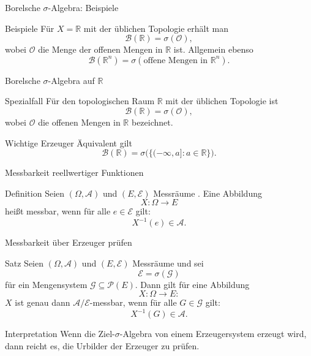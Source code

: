 \documentclass{beamer}
\begin{document}
\begin{frame}{Borelsche \(\sigma\)-Algebra: Beispiele}
\begin{block}{Beispiele}
Für \(X=\mathbb R\) mit der üblichen Topologie erhält man
\[
\mathcal B(\mathbb R)=\sigma(\mathcal O),
\]
wobei \(\mathcal O\) die Menge der offenen Mengen in \(\mathbb R\) ist.
Allgemein ebenso
\[
\mathcal B(\mathbb R^n)=\sigma(\text{offene Mengen in }\mathbb R^n).
\]
\end{block}
\end{frame}

\begin{frame}{Borelsche \(\sigma\)-Algebra auf \(\mathbb R\)}
\begin{block}{Spezialfall}
Für den topologischen Raum \(\mathbb R\) mit der üblichen Topologie ist
\[
\mathcal B(\mathbb R)=\sigma(\mathcal O),
\]
wobei \(\mathcal O\) die offenen Mengen in \(\mathbb R\) bezeichnet.
\end{block}

\begin{block}{Wichtige Erzeuger}
Äquivalent gilt
\[
\mathcal B(\mathbb R)=\sigma\bigl(\{(-\infty,a] : a\in\mathbb R\}\bigr).
\]
\end{block}
\end{frame}

\begin{frame}{Messbarkeit reellwertiger Funktionen}
\begin{block}{Definition}
Seien \((\Omega,\mathcal A)\) und \((E,\mathcal E)\) Messräume .
Eine Abbildung
\[
X :\Omega \to E
\]
hei\ss{}t messbar, wenn für alle \(e \in \mathcal E \) gilt:
\[
X^{-1}(e)\in\mathcal A.
\]
\end{block}
\end{frame}

\begin{frame}{Messbarkeit über Erzeuger prüfen}
\begin{block}{Satz}
Seien \((\Omega,\mathcal A)\) und \((E,\mathcal E)\) Messräume und sei
\[
\mathcal E=\sigma(\mathcal G)
\]
für ein Mengensystem \(\mathcal G\subseteq\mathcal P(E)\).
Dann gilt für eine Abbildung
\[
X\colon \Omega\to E:
\]
\(X\) ist genau dann \(\mathcal A/\mathcal E\)-messbar, wenn für alle \(G\in\mathcal G\) gilt:
\[
X^{-1}(G)\in\mathcal A.
\]
\end{block}

\begin{block}{Interpretation}
Wenn die Ziel-\(\sigma\)-Algebra von einem Erzeugersystem erzeugt wird, dann reicht es, die Urbilder der Erzeuger zu prüfen.
\end{block}
\end{frame}
\end{document}
